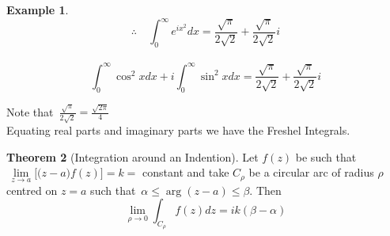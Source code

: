 \documentclass[11pt,a4paper]{article}
\theoremstyle{definition}
\newtheorem{thm}{Theorem}[section]
\newtheorem{example}[thm]{Example}
\begin{document}
\begin{example}
$$\therefore\quad  \int^{\infty}_0 e^{ix^2}dx = \frac{\sqrt{\pi}}{2\sqrt{2}} + \frac{\sqrt{\pi}}{2\sqrt{2}}i$$\\

$$\int^{\infty}_0 \cos^2xdx + i\int^{\infty}_0 \sin^2xdx = \frac{\sqrt{\pi}}{2\sqrt{2}} +  \frac{\sqrt{\pi}}{2\sqrt{2}}i $$

Note that $\,\frac{\sqrt{\pi}}{2\sqrt{2}} = \frac{\sqrt{2\pi}}{4}\,$\\

Equating real parts and imaginary parts we have the Freshel Integrals.
\end{example}

\begin{thm}[Integration around an Indention]
Let $f(z)$ be such that $\,\lim\limits_{z\longrightarrow a}\big[\big(z - a\big)f(z)\big] = k = $ constant and take $C_{\rho}$ be a circular arc of radius $\rho$ centred on $z = a$ such that $\, \alpha \leq \operatorname{arg}(z - a) \leq \beta$. Then $$\lim\limits_{\rho \longrightarrow 0}\int_{C_{\rho}}f(z)dz = i k (\beta - \alpha )$$
\end{thm}
\end{document}
